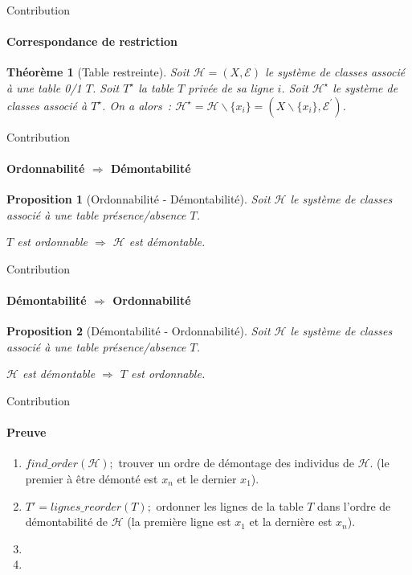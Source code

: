 \documentclass{beamer}
\newtheorem{proposition}{Proposition}
\newtheorem{theo}{Théorème}
\begin{document}
  \begin{frame}{Contribution}
  \framesubtitle{Correspondance de restriction}
  \begin{theo}[Table restreinte]
  Soit $\mathcal{H} = (X, \mathcal{E})$ le système de classes associé à une table 0/1 $T$.
  Soit $T^{\star}$ la table $T$ privée de sa ligne $i$.
  Soit $\mathcal{H}^{\star}$ le système de classes associé à $T^{\star}$.
  On a alors~: 
  $\mathcal{H}^{\star} = \mathcal{H} \backslash \{x_i\}  =(X \backslash \{x_i\} , \mathcal{E}^{'})$.
  \end{theo}
  \end{frame}

  \begin{frame}{Contribution}
  \framesubtitle{Ordonnabilité $\Rightarrow$ Démontabilité}
  \begin{proposition}[Ordonnabilité - Démontabilité]
  Soit $\mathcal{H}$ le système de classes associé à une table présence/absence $T$.

  $T$ est ordonnable $\Rightarrow$ $\mathcal{H}$ est démontable. 
  \end{proposition}
  \end{frame}

  \begin{frame}{Contribution}
  \framesubtitle{Démontabilité $\Rightarrow$ Ordonnabilité}
  \begin{proposition}[Démontabilité - Ordonnabilité]
  Soit $\mathcal{H}$ le système de classes associé à une table présence/absence $T$.

  $\mathcal{H}$ est démontable $\Rightarrow$ $T$ est ordonnable. 
  \end{proposition}
  \end{frame}

  \begin{frame}{Contribution}
  \framesubtitle{Preuve}

\begin{enumerate}
\item $find\_order(\mathcal{H});$ trouver un ordre de démontage des individus de $\mathcal{H}$. (le premier à être démonté est $x_n$ et le dernier $x_1$).
\item $T' = lignes\_reorder(T);$ ordonner les lignes de la table $T$ dans l'ordre de démontabilité de $\mathcal{H}$ (la première ligne est $x_1$ et la dernière est $x_n$).
\item
\item 
\end{enumerate}

  \end{frame}
\end{document}
